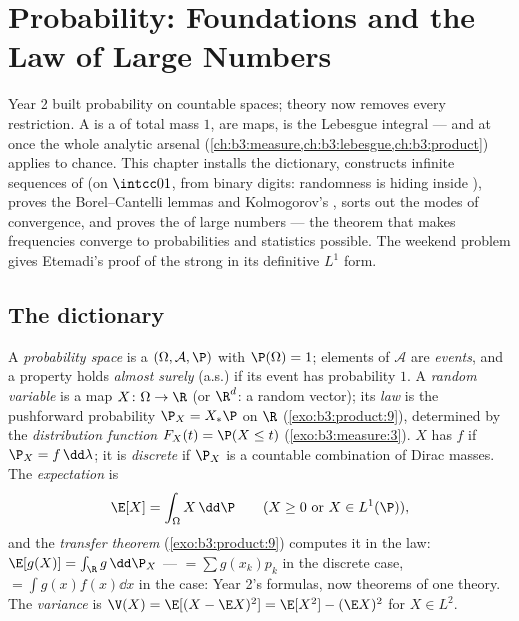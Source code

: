 \chapter{Probability: Foundations and the Law of Large
Numbers}\label{ch:b3:probability}

Year 2 built probability on countable spaces;  theory
now removes every restriction. A  is a
 of total mass $1$,  are
 maps,  is the Lebesgue integral --- and
at once the whole analytic arsenal
(\cref{ch:b3:measure,ch:b3:lebesgue,ch:b3:product}) applies to
chance. This chapter installs the dictionary, constructs
infinite sequences of   (on
$\intcc01$, from binary digits: randomness is hiding inside
), proves the Borel--Cantelli lemmas and
Kolmogorov's , sorts out the modes of
convergence, and proves the  of large numbers --- the
theorem that makes frequencies converge to probabilities and
statistics possible. The weekend problem gives Etemadi's proof
of the strong  in its definitive $L^1$ form.

\section{The dictionary}

\begin{definition}\label{def:b3:probability:space}
A \emph{probability space} is a
 $(\Omega, \mathcal A, \P)$ with $\P(\Omega) =
1$; elements of $\mathcal A$ are \emph{events}, and a property
holds \emph{almost surely} (a.s.) if its event has
probability $1$. A \emph{random variable} is a  map $X \colon \Omega \to \R$ (or
$\R^d$: a random vector); its \emph{law} is the pushforward probability  $\P_X =
X_*\P$ on $\R$ (\cref{exo:b3:product:9}), determined by the
\emph{distribution function} $F_X(t) = \P(X \leq t)$
(\cref{exo:b3:measure:3}). $X$ has \emph{} $f$ if
$\P_X = f\,\dd\lambda$; it is \emph{discrete} if $\P_X$ is a
countable combination of Dirac masses. The
\emph{expectation} is
\[
\E[X] = \int_\Omega X\,\dd\P
\qquad (X \geq 0 \text{ or } X \in L^1(\P)),
\]
and the \emph{transfer theorem} (\cref{exo:b3:product:9})
computes it in the law: $\E[g(X)] = \int_\R g\,\dd\P_X$ ---
$= \sum g(x_k)p_k$ in the discrete case, $= \int
g(x)f(x)\dd x$ in the  case: Year 2's formulas, now
theorems of one theory. The \emph{variance} is $\V(X) =
\E[(X - \E X)^2] = \E[X^2] - (\E X)^2$ for $X \in L^2$.
\end{definition}

